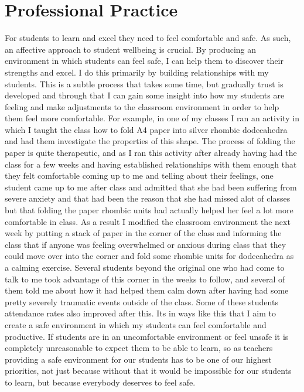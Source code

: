 \documentclass[a4paper,12pt]{report}
\begin{document}
\section*{Professional Practice}

For students to learn and excel they need to feel comfortable and safe. As such, an affective approach to student wellbeing is crucial. By producing an environment in which students can feel safe, I can help them to discover their strengths and excel. I do this primarily by building relationships with my students. This is a subtle process that takes some time, but gradually trust is developed and through that I can gain some insight into how my students are feeling and make adjustments to the classroom environment in order to help them feel more comfortable. For example, in one of my classes I ran an activity in which I taught the class how to fold A4 paper into silver rhombic dodecahedra and had them investigate the properties of this shape. The process of folding the paper is quite therapeutic, and as I ran this activity after already having had the class for a few weeks and having established relationships with them enough that they felt comfortable coming up to me and telling about their feelings, one student came up to me after class and admitted that she had been suffering from severe anxiety and that had been the reason that she had missed alot of classes but that folding the paper rhombic units had actually helped her feel a lot more comfortable in class. As a result I modified the classroom environment the next week by putting a stack of paper in the corner of the class and informing the class that if anyone was feeling overwhelmed or anxious during class that they could move over into the corner and fold some rhombic units for dodecahedra as a calming exercise. Several students beyond the original one who had come to talk to me took advantage of this corner in the weeks to follow, and several of them told me about how it had helped them calm down after having had some pretty severely traumatic events outside of the class. Some of these students attendance rates also improved after this. Its in ways like this that I aim to create a safe environment in which my students can feel comfortable and productive. If students are in an uncomfortable environment or feel unsafe it is completely unreasonable to expect them to be able to learn, so as teachers providing a safe environment for our students has to be one of our highest priorities, not just because without that it would be impossible for our students to learn, but because everybody deserves to feel safe.
\end{document}
